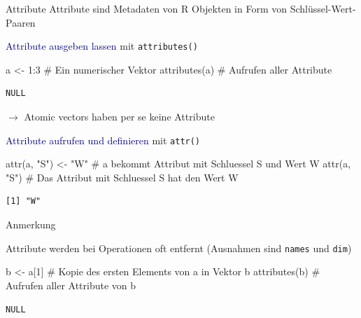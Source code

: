 \documentclass[
  8pt,
  ignorenonframetext,
]{beamer}
\newenvironment{Shaded}{\begin{snugshade}}{\end{snugshade}}
\newcommand{\CommentTok}[1]{\textcolor[rgb]{0.37,0.37,0.37}{#1}}
\newcommand{\DecValTok}[1]{\textcolor[rgb]{0.68,0.00,0.00}{#1}}
\newcommand{\FunctionTok}[1]{\textcolor[rgb]{0.28,0.35,0.67}{#1}}
\newcommand{\NormalTok}[1]{\textcolor[rgb]{0.00,0.23,0.31}{#1}}
\newcommand{\OtherTok}[1]{\textcolor[rgb]{0.00,0.23,0.31}{#1}}
\newcommand{\SpecialCharTok}[1]{\textcolor[rgb]{0.37,0.37,0.37}{#1}}
\newcommand{\StringTok}[1]{\textcolor[rgb]{0.13,0.47,0.30}{#1}}
\begin{document}
\begin{frame}[fragile]{Attribute}
\protect\hypertarget{attribute-1}{}
Attribute sind Metadaten von R Objekten in Form von
Schlüssel-Wert-Paaren

\vfill

\small

\textcolor{darkblue}{Attribute ausgeben lassen} mit
\texttt{attributes()}

\tiny

\begin{Shaded}
\begin{Highlighting}[]
\NormalTok{a }\OtherTok{\textless{}{-}} \DecValTok{1}\SpecialCharTok{:}\DecValTok{3}                \CommentTok{\# Ein numerischer Vektor}
\FunctionTok{attributes}\NormalTok{(a)           }\CommentTok{\# Aufrufen aller Attribute}
\end{Highlighting}
\end{Shaded}

\begin{verbatim}
NULL
\end{verbatim}

\small \(\to\) Atomic vectors haben per se keine Attribute

\textcolor{darkblue}{Attribute aufrufen und definieren} mit
\texttt{attr()}

\tiny

\begin{Shaded}
\begin{Highlighting}[]
\FunctionTok{attr}\NormalTok{(a, }\StringTok{"S"}\NormalTok{) }\OtherTok{\textless{}{-}} \StringTok{"W"}     \CommentTok{\# a bekommt Attribut mit Schluessel S und Wert W}
\FunctionTok{attr}\NormalTok{(a, }\StringTok{"S"}\NormalTok{)            }\CommentTok{\# Das Attribut mit Schluessel S hat den Wert W}
\end{Highlighting}
\end{Shaded}

\begin{verbatim}
[1] "W"
\end{verbatim}

\vfill
\footnotesize

Anmerkung

\tiny

Attribute werden bei Operationen oft entfernt (Ausnahmen sind
\texttt{names} und \texttt{dim})

\begin{Shaded}
\begin{Highlighting}[]
\NormalTok{b }\OtherTok{\textless{}{-}}\NormalTok{ a[}\DecValTok{1}\NormalTok{]               }\CommentTok{\# Kopie des ersten Elements von a in Vektor b}
\FunctionTok{attributes}\NormalTok{(b)           }\CommentTok{\# Aufrufen aller Attribute von b}
\end{Highlighting}
\end{Shaded}

\begin{verbatim}
NULL
\end{verbatim}
\end{frame}
\end{document}
